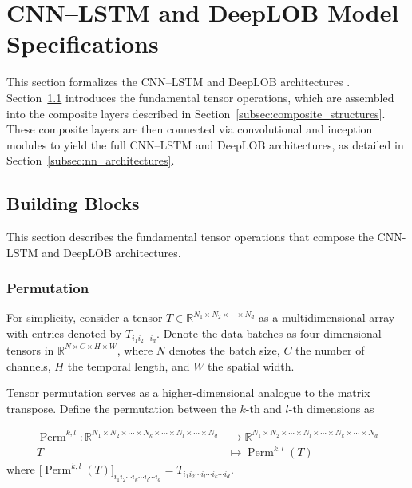 \documentclass[10pt,a4paper,oneside]{article}
\newcommand{\R}{\mathbb{R}}
\DeclareMathOperator{\perm}{Perm}
\begin{document}
\clearpage
\section{CNN–LSTM and DeepLOB Model Specifications}
\label{ap:nn_specs}

This section formalizes the CNN–LSTM and DeepLOB architectures \cite{kolm2023deep, Zhang_2019}.  Section~\ref{subsec:building_blocks} introduces the fundamental tensor operations, which are assembled into the composite layers described in Section~\ref{subsec:composite_structures}.  These composite layers are then connected via convolutional and inception modules to yield the full CNN–LSTM and DeepLOB architectures, as detailed in Section~\ref{subsec:nn_architectures}.

\subsection{Building Blocks}
\label{subsec:building_blocks}

This section describes the fundamental tensor operations that compose the CNN-LSTM and DeepLOB architectures. 

\subsubsection{Permutation}

For simplicity, consider a tensor $T \in \mathbb{R}^{N_1 \times N_2 \times \cdots \times N_d}$ as a multidimensional array with entries denoted by $T_{i_1 i_2 \cdots i_d}$. Denote the data batches as four-dimensional tensors in \(\mathbb{R}^{N \times C \times H \times W}\), where \(N\) denotes the batch size, \(C\) the number of channels, \(H\) the temporal length, and \(W\) the spatial width.

Tensor permutation serves as a higher-dimensional analogue to the matrix transpose. Define the permutation between the $k$-th and $l$-th dimensions as 

\begin{align*}
    \perm^{k, l}: \R^{N_1 \times N_2 \times \cdots \times N_k \times \cdots \times N_l \times \cdots \times N_d} &\rightarrow \R^{N_1 \times N_2 \times \cdots \times N_l \times \cdots \times N_k \times \cdots \times N_d}\\
    T &\mapsto \perm^{k, l}(T)
\end{align*}
where $\bigl[\perm^{k, l}(T)\bigr]_{i_1 i_2 \cdots i_k \cdots i_l \cdots i_d} = T_{i_1 i_2 \cdots i_l \cdots i_k \cdots i_d}$. 
\end{document}
